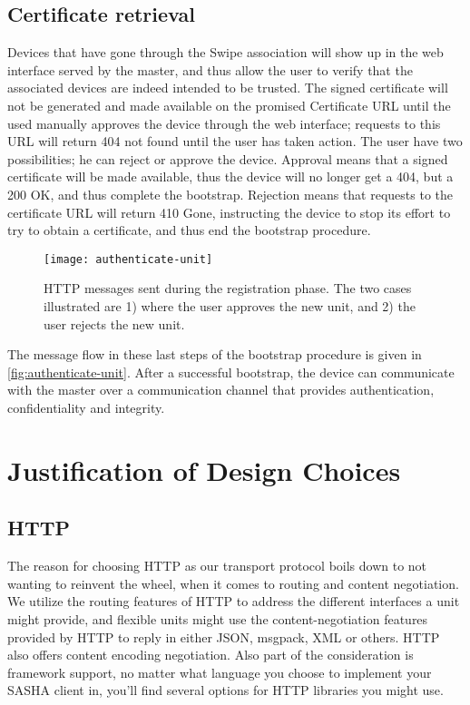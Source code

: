 \subsection{Certificate retrieval}
Devices that have gone through the Swipe association will show up in the web interface served by the master, and thus allow the user to verify that the associated devices are indeed intended to be trusted. The signed certificate will not be generated and made available on the promised Certificate URL until the used manually approves the device through the web interface; requests to this URL will return 404 not found until the user has taken action.
The user have two possibilities; he can reject or approve the device. Approval means that a signed certificate will be made available, thus the device will no longer get a 404, but a 200 OK, and thus complete the bootstrap. Rejection means that requests to the certificate URL will return 410 Gone, instructing the device to stop its effort to try to obtain a certificate, and thus end the bootstrap procedure.

\begin{figure}[ht!]
    \centering
    \texttt{[image: authenticate-unit]}
    \caption{HTTP messages sent during the registration phase. The two cases illustrated are 1) where the user approves the new unit, and 2) the user rejects the new unit.}
    \label{fig:authenticate-unit}
\end{figure}

The message flow in these last steps of the bootstrap procedure is given in \autoref{fig:authenticate-unit}. After a successful bootstrap, the device can communicate with the master over a communication channel that provides authentication, confidentiality and integrity.


\section{Justification of Design Choices}

\subsection{HTTP}
The reason for choosing HTTP as our transport protocol boils down to not wanting to reinvent the wheel, when it comes to routing and content negotiation. We utilize the routing features of HTTP to address the different interfaces a unit might provide, and flexible units might use the content-negotiation features provided by HTTP to reply in either JSON, msgpack, XML or others. HTTP also offers content encoding negotiation. Also part of the consideration is framework support, no matter what language you choose to implement your SASHA client in, you'll find several options for HTTP libraries you might use.

